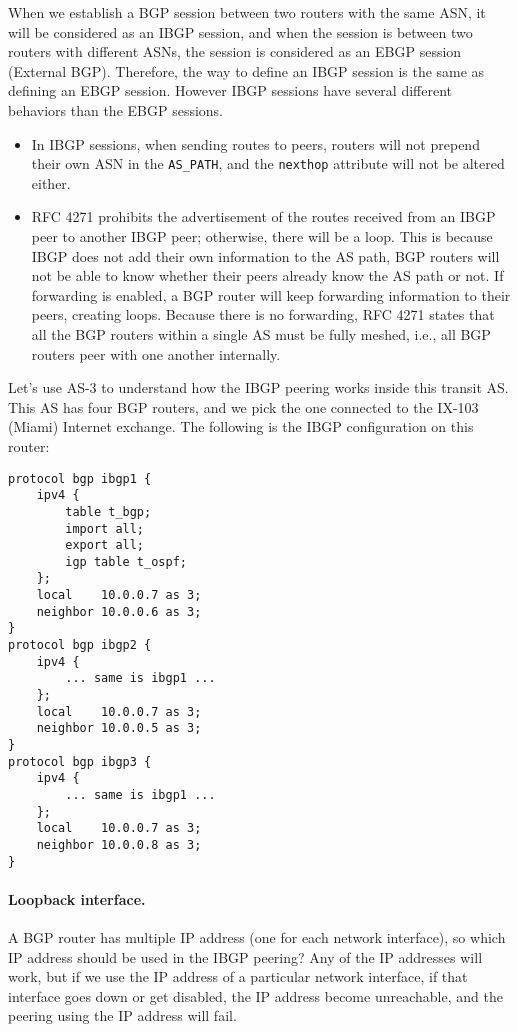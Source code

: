 When we establish a BGP session between two routers with the same ASN, it will be considered
as an IBGP session, and when the session is between two routers with different ASNs, the session
is considered as an EBGP session (External BGP).
Therefore, the way to define
an IBGP session is the same as defining an EBGP session.
However IBGP sessions have several different behaviors 
than the EBGP sessions.


\begin{itemize}
\item In IBGP sessions, when sending routes to peers,
routers will not prepend their own ASN in the \texttt{AS\_PATH},
and the \texttt{nexthop} attribute will not be altered either.

\item RFC 4271 prohibits the advertisement of the routes received from 
an IBGP peer to another IBGP peer; otherwise, there will be a loop.
This is because IBGP does not add their own information
to the AS path, BGP routers will not be able to know whether
their peers already know the AS path or not. If forwarding
is enabled, a BGP router will keep forwarding information
to their peers, creating loops. 
Because there is no forwarding, 
RFC 4271 states that all the BGP routers within a single AS must be 
fully meshed, i.e., all BGP routers peer with one another internally.
\end{itemize}


Let's use AS-3 to understand how the IBGP peering works inside 
this transit AS. 
This AS has four BGP routers, and we pick the one 
connected to the IX-103 (Miami) Internet exchange.
The following is the IBGP configuration on this router:

\begin{lstlisting}
protocol bgp ibgp1 {
    ipv4 {
        table t_bgp;
        import all;
        export all;
        igp table t_ospf;
    };
    local    10.0.0.7 as 3;
    neighbor 10.0.0.6 as 3;
}
protocol bgp ibgp2 {
    ipv4 {
        ... same is ibgp1 ...
    };
    local    10.0.0.7 as 3;
    neighbor 10.0.0.5 as 3;
}
protocol bgp ibgp3 {
    ipv4 {
        ... same is ibgp1 ...
    };
    local    10.0.0.7 as 3;
    neighbor 10.0.0.8 as 3;
}
\end{lstlisting}


\paragraph{Loopback interface.}
A BGP router has multiple IP address (one for each network interface), so which IP address
should be used in the IBGP peering? Any of the IP addresses will work, but 
if we use the IP address of a particular network interface, if that interface 
goes down or get disabled, the IP address become unreachable, and the 
peering using the IP address will fail. 

